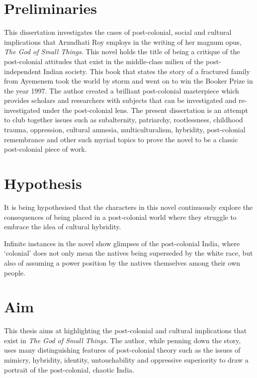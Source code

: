 
\section{Preliminaries}

This dissertation investigates the cases of post-colonial, social and cultural implications that Arundhati Roy employs in the writing of her magnum opus, \emph{The God of Small Things}. This novel holds the title of being a critique of the post-colonial attitudes that exist in the middle-class milieu of the post-independent Indian society. This book that states the story of a fractured family from Ayemenem took the world by storm and went on to win the Booker Prize in the year 1997. The author created a brilliant post-colonial masterpiece which provides scholars and researchers with subjects that can be investigated and re-investigated under the post-colonial lens. The present dissertation is an attempt to club together issues such as subalternity, patriarchy, rootlessness, childhood trauma, oppression, cultural amnesia, multiculturalism, hybridity, \linebreak post-colonial remembrance and other such myriad topics to prove the novel to be a classic post-colonial piece of work.

\section{Hypothesis}

It is being hypothesised that the characters in this novel continuously explore the consequences of being placed in a post-colonial world where they struggle to embrace the idea of cultural hybridity.

Infinite instances in the novel show glimpses of the post-colonial India, where ‘colonial’ does not only mean the natives being superseded by the white race, but also of assuming a power position by the natives themselves among their own people. 

\section{Aim}

This thesis aims at highlighting the post-colonial and cultural implications that exist in \emph{The God of Small Things}. The author, while penning down the story, uses many distinguishing features of post-colonial theory such as the issues of mimicry, hybridity, identity, untouchability and oppressive superiority to draw a portrait of the post-colonial, chaotic India.

